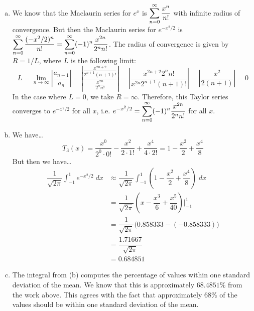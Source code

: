\documentclass[11pt,letterpaper]{article}
\begin{document}
\sol 
\begin{enumerate}[(a)]
\item We know that the Maclaurin series for $e^x$ is $\displaystyle \sum_{n=0}^\infty \dfrac{x^n}{n!}$ with infinite radius of convergence. But then the Maclaurin series for $e^{-x^2/2}$ is $\displaystyle \sum_{n=0}^\infty \dfrac{(-x^2/2)^n}{n!}= \sum_{n=0}^\infty (-1)^n \dfrac{x^{2n}}{2^n n!}$. The radius of convergence is given by $R= 1/L$, where $L$ is the following limit:
	\[
	L= \lim_{n \to \infty} \left| \dfrac{a_{n+1}}{a_n} \right|= \left| \dfrac{\frac{x^{2n+2}}{2^{n+1} (n+1)!}}{\frac{x^{2n}}{2^n n!}} \right|= \left| \dfrac{x^{2n+2} 2^n n!}{x^{2n} 2^{n+1} (n+1)!} \right|= \left| \dfrac{x^2}{2(n + 1)} \right|= 0 
	\]
In the case where $L= 0$, we take $R= \infty$. Therefore, this Taylor series converges to $e^{-x^2/2}$ for all $x$, i.e. $\displaystyle e^{-x^2/2}= \sum_{n=0}^\infty (-1)^n \dfrac{x^{2n}}{2^n n!}$ for all $x$. 

\item We have\dots
	\[
	T_3(x)= \dfrac{x^0}{2^0 \cdot 0!} - \dfrac{x^2}{2 \cdot 1!} + \dfrac{x^4}{4 \cdot 2!}= 1 - \dfrac{x^2}{2} + \dfrac{x^4}{8}
	\]
But then we have\dots
	\[
	\begin{aligned}
	\dfrac{1}{\sqrt{2\pi}} \int_{-1}^1 e^{-x^2/2} \;dx &\approx \dfrac{1}{\sqrt{2\pi}} \int_{-1}^1 \left(1 - \dfrac{x^2}{2} + \dfrac{x^4}{8} \right) \;dx \\
	&= \dfrac{1}{\sqrt{2\pi}} \left(x - \dfrac{x^3}{6} + \dfrac{x^5}{40} \right) \bigg|_{-1}^1 \\
	&= \dfrac{1}{\sqrt{2\pi}} \big(0.858333 - (-0.858333) \big) \\
	&= \dfrac{1.71667}{\sqrt{2\pi}} \\
	&= 0.684851
	\end{aligned}
	\]

\item The integral from (b) computes the percentage of values within one standard deviation of the mean. We know that this is approximately $68.4851\%$ from the work above. This agrees with the fact that approximately 68\% of the values should be within one standard deviation of the mean. 
\end{enumerate}
\end{document}
